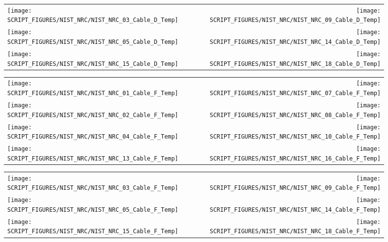 \begin{figure}[!ht]
\begin{tabular*}{\textwidth}{l@{\extracolsep{\fill}}r}
\texttt{[image: SCRIPT\_FIGURES/NIST\_NRC/NIST\_NRC\_03\_Cable\_D\_Temp]} &
\texttt{[image: SCRIPT\_FIGURES/NIST\_NRC/NIST\_NRC\_09\_Cable\_D\_Temp]} \\
\texttt{[image: SCRIPT\_FIGURES/NIST\_NRC/NIST\_NRC\_05\_Cable\_D\_Temp]} &
\texttt{[image: SCRIPT\_FIGURES/NIST\_NRC/NIST\_NRC\_14\_Cable\_D\_Temp]} \\
\texttt{[image: SCRIPT\_FIGURES/NIST\_NRC/NIST\_NRC\_15\_Cable\_D\_Temp]} &
\texttt{[image: SCRIPT\_FIGURES/NIST\_NRC/NIST\_NRC\_18\_Cable\_D\_Temp]}
\end{tabular*}
\label{NIST_NRC_Cable_D_Open}
\end{figure}

\begin{figure}[!ht]
\begin{tabular*}{\textwidth}{l@{\extracolsep{\fill}}r}
\texttt{[image: SCRIPT\_FIGURES/NIST\_NRC/NIST\_NRC\_01\_Cable\_F\_Temp]} &
\texttt{[image: SCRIPT\_FIGURES/NIST\_NRC/NIST\_NRC\_07\_Cable\_F\_Temp]} \\
\texttt{[image: SCRIPT\_FIGURES/NIST\_NRC/NIST\_NRC\_02\_Cable\_F\_Temp]} &
\texttt{[image: SCRIPT\_FIGURES/NIST\_NRC/NIST\_NRC\_08\_Cable\_F\_Temp]} \\
\texttt{[image: SCRIPT\_FIGURES/NIST\_NRC/NIST\_NRC\_04\_Cable\_F\_Temp]} &
\texttt{[image: SCRIPT\_FIGURES/NIST\_NRC/NIST\_NRC\_10\_Cable\_F\_Temp]} \\
\texttt{[image: SCRIPT\_FIGURES/NIST\_NRC/NIST\_NRC\_13\_Cable\_F\_Temp]} &
\texttt{[image: SCRIPT\_FIGURES/NIST\_NRC/NIST\_NRC\_16\_Cable\_F\_Temp]}
\end{tabular*}
\label{NIST_NRC_Cable_F_Closed}
\end{figure}

\begin{figure}[!ht]
\begin{tabular*}{\textwidth}{l@{\extracolsep{\fill}}r}
\texttt{[image: SCRIPT\_FIGURES/NIST\_NRC/NIST\_NRC\_03\_Cable\_F\_Temp]} &
\texttt{[image: SCRIPT\_FIGURES/NIST\_NRC/NIST\_NRC\_09\_Cable\_F\_Temp]} \\
\texttt{[image: SCRIPT\_FIGURES/NIST\_NRC/NIST\_NRC\_05\_Cable\_F\_Temp]} &
\texttt{[image: SCRIPT\_FIGURES/NIST\_NRC/NIST\_NRC\_14\_Cable\_F\_Temp]} \\
\texttt{[image: SCRIPT\_FIGURES/NIST\_NRC/NIST\_NRC\_15\_Cable\_F\_Temp]} &
\texttt{[image: SCRIPT\_FIGURES/NIST\_NRC/NIST\_NRC\_18\_Cable\_F\_Temp]}
\end{tabular*}
\label{NIST_NRC_Cable_F_Open}
\end{figure}

